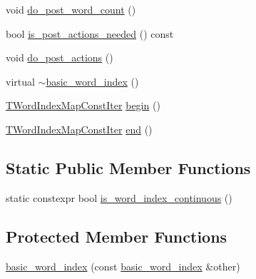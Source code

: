\begin{DoxyCompactItemize}
\item 
void \hyperlink{classuva_1_1smt_1_1bpbd_1_1server_1_1lm_1_1dictionary_1_1basic__word__index_acf79abcb2e0fe7cf8f2b620c07d92e71}{do\+\_\+post\+\_\+word\+\_\+count} ()
\item 
bool \hyperlink{classuva_1_1smt_1_1bpbd_1_1server_1_1lm_1_1dictionary_1_1basic__word__index_a110c800325226169f3d4ab1e66972534}{is\+\_\+post\+\_\+actions\+\_\+needed} () const 
\item 
void \hyperlink{classuva_1_1smt_1_1bpbd_1_1server_1_1lm_1_1dictionary_1_1basic__word__index_a6be17e94509d14ece2816c262a1b5e9c}{do\+\_\+post\+\_\+actions} ()
\item 
virtual \hyperlink{classuva_1_1smt_1_1bpbd_1_1server_1_1lm_1_1dictionary_1_1basic__word__index_a285da0c7ded7f8cf4b1b9a9caf454b7f}{$\sim$basic\+\_\+word\+\_\+index} ()
\item 
\hyperlink{classuva_1_1smt_1_1bpbd_1_1server_1_1lm_1_1dictionary_1_1basic__word__index_ac35f9263ddd75993ac68944b4521ec38}{T\+Word\+Index\+Map\+Const\+Iter} \hyperlink{classuva_1_1smt_1_1bpbd_1_1server_1_1lm_1_1dictionary_1_1basic__word__index_ac15584ac8f61497eedc4de6cb1619e5d}{begin} ()
\item 
\hyperlink{classuva_1_1smt_1_1bpbd_1_1server_1_1lm_1_1dictionary_1_1basic__word__index_ac35f9263ddd75993ac68944b4521ec38}{T\+Word\+Index\+Map\+Const\+Iter} \hyperlink{classuva_1_1smt_1_1bpbd_1_1server_1_1lm_1_1dictionary_1_1basic__word__index_a7736fedb999ac6754a335feddf24b363}{end} ()
\end{DoxyCompactItemize}
\subsection*{Static Public Member Functions}
\begin{DoxyCompactItemize}
\item 
static constexpr bool \hyperlink{classuva_1_1smt_1_1bpbd_1_1server_1_1lm_1_1dictionary_1_1basic__word__index_ac429df930993d15c5944686b0e33973c}{is\+\_\+word\+\_\+index\+\_\+continuous} ()
\end{DoxyCompactItemize}
\subsection*{Protected Member Functions}
\begin{DoxyCompactItemize}
\item 
\hyperlink{classuva_1_1smt_1_1bpbd_1_1server_1_1lm_1_1dictionary_1_1basic__word__index_a04b0528afc961cff02f6d0e335ebd1f9}{basic\+\_\+word\+\_\+index} (const \hyperlink{classuva_1_1smt_1_1bpbd_1_1server_1_1lm_1_1dictionary_1_1basic__word__index}{basic\+\_\+word\+\_\+index} \&other)
\end{DoxyCompactItemize}
